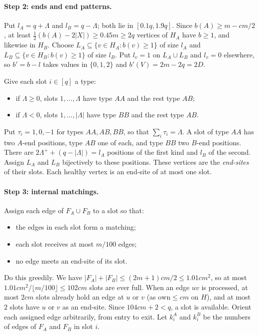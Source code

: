 \documentclass[11pt]{article}
\theoremstyle{definition}
\newcommand{\own}{\mathrm{own}}
\begin{document}
\paragraph{Step 2: ends and end patterns.} Put $l_A=q+\Lambda$ and $l_B=q-\Lambda$; both lie in $[0.1q,1.9q]$. Since $b(A)\ge m-cm/2$, at least $\tfrac12(b(A)-2|X|)\ge0.45m\ge2q$ vertices of $H_A$ have $b\ge1$, and likewise in $H_B$. Choose $L_A\subseteq\{v\in H_A:b(v)\ge1\}$ of size $l_A$ and $L_B\subseteq\{v\in H_B:b(v)\ge1\}$ of size $l_B$. Put $l_v=1$ on $L_A\cup L_B$ and $l_v=0$ elsewhere, so $b'=b-l$ takes values in $\{0,1,2\}$ and $b'(V)=2m-2q=2D$.

Give each slot $i\in[q]$ a type:
\begin{itemize}[nosep]
\item if $\Lambda\ge0$, slots $1,\dots,\Lambda$ have type $AA$ and the rest type $AB$;
\item if $\Lambda<0$, slots $1,\dots,|\Lambda|$ have type $BB$ and the rest type $AB$.
\end{itemize}
Put $\tau_i=1,0,-1$ for types $AA,AB,BB$, so that $\sum_i\tau_i=\Lambda$. A slot of type $AA$ has two $A$-end positions, type $AB$ one of each, and type $BB$ two $B$-end positions. There are $2\Lambda^++(q-|\Lambda|)=l_A$ positions of the first kind and $l_B$ of the second. Assign $L_A$ and $L_B$ bijectively to these positions. These vertices are the \emph{end-sites} of their slots. Each healthy vertex is an end-site of at most one slot.

\paragraph{Step 3: internal matchings.} Assign each edge of $F_A\cup F_B$ to a slot so that:
\begin{itemize}[nosep]
\item the edges in each slot form a matching;
\item each slot receives at most $m/100$ edges;
\item no edge meets an end-site of its slot.
\end{itemize}
Do this greedily. We have $|F_A|+|F_B|\le(2m+1)cm/2\le1.01cm^2$, so at most $1.01cm^2/\lfloor m/100\rfloor\le102cm$ slots are ever full. When an edge $uv$ is processed, at most $2cm$ slots already hold an edge at $u$ or $v$ (as $\own\le cm$ on $H$), and at most $2$ slots have $u$ or $v$ as an end-site. Since $104cm+2<q$, a slot is available. Orient each assigned edge arbitrarily, from entry to exit. Let $k^A_i$ and $k^B_i$ be the numbers of edges of $F_A$ and $F_B$ in slot $i$.
\end{document}

